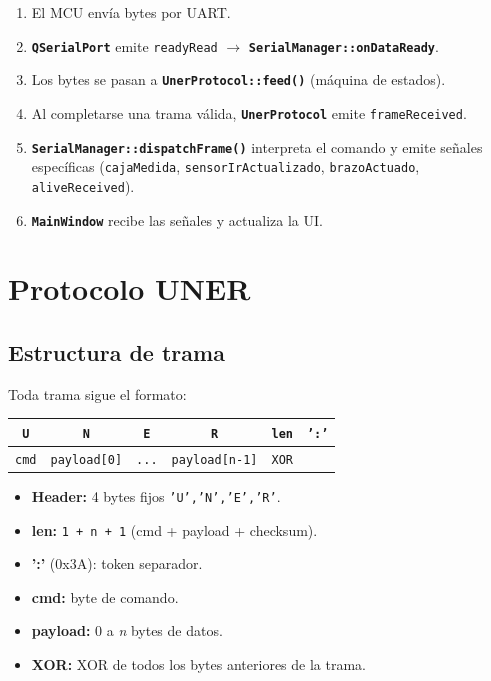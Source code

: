 \documentclass[12pt,a4paper]{report}
\newcommand{\class}[1]{\texttt{\textbf{#1}}}
\begin{document}
\begin{enumerate}
  \item El MCU envía bytes por UART.
  \item \class{QSerialPort} emite \texttt{readyRead} $\rightarrow$ \class{SerialManager::onDataReady}.
  \item Los bytes se pasan a \class{UnerProtocol::feed()} (máquina de estados).
  \item Al completarse una trama válida, \class{UnerProtocol} emite \texttt{frameReceived}.
  \item \class{SerialManager::dispatchFrame()} interpreta el comando y emite señales específicas
        (\texttt{cajaMedida}, \texttt{sensorIrActualizado}, \texttt{brazoActuado}, \texttt{aliveReceived}).
  \item \class{MainWindow} recibe las señales y actualiza la UI.
\end{enumerate}

\chapter{Protocolo UNER}

\section{Estructura de trama}

Toda trama sigue el formato:

\begin{center}
\begin{tabular}{|c|c|c|c|c|c|}
\hline
\texttt{U} & \texttt{N} & \texttt{E} & \texttt{R} & \texttt{len} & \texttt{':'} \\
\hline
\texttt{cmd} & \texttt{payload[0]} & \texttt{...} & \texttt{payload[n-1]} & \texttt{XOR} & \\
\hline
\end{tabular}
\end{center}

\begin{itemize}
  \item \textbf{Header:} 4 bytes fijos \texttt{'U','N','E','R'}.
  \item \textbf{len:} \texttt{1 + n + 1} (cmd + payload + checksum).
  \item \textbf{':'} (0x3A): token separador.
  \item \textbf{cmd:} byte de comando.
  \item \textbf{payload:} 0 a \textit{n} bytes de datos.
  \item \textbf{XOR:} XOR de todos los bytes anteriores de la trama.
\end{itemize}
\end{document}
